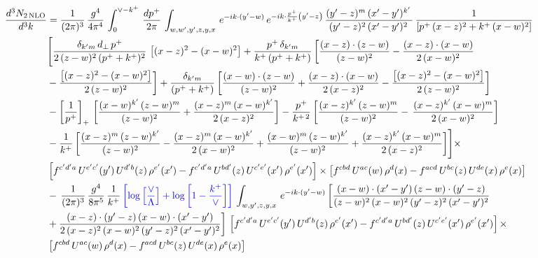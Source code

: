 \documentclass[9pt]{article}
\numberwithin{equation}{section}
\begin{document}
\begin{align}
 \frac{d^{3}N_{2\,\rm NLO}}{d^{3}k} & = \frac{1}{(2\pi)^{3}}\,\frac{g^{4}}{4\pi^{4}}\,\int_{0}^{\vee-k^{+}}\, \frac{dp^{+}}{2\pi}\,\int_{w,w',y',z,y,x}\, e^{-ik\cdot (y'-w)}\,e^{-ik\cdot \frac{p^{+}}{k^{+}}\left(y'-z\right)}\, \frac{(y'-z)^{m}\,(x'-y')^{k'}\,}{(y'-z)^{2}\,(x'-y')^{2}\,}\, \frac{1}{\left[p^{+}\,(x-z)^{2}+k^{+}\,(x-w)^{2}\right]}\notag \\ & \Bigg[\frac{\delta_{k'm}\,d_{\perp}\,p^{+}}{2\,(z-w)^{2}\,(p^{+}+k^{+})^{2}}\, \left[(x-z)^{2}-(x-w)^{2}\right]+\frac{p^{+}\,\delta_{k'm}}{k^{+}\,(p^{+}+k^{+})}\,\bigg[\frac{(x-z)\cdot (z-w)}{(z-w)^{2}} -\frac{(x-z)\cdot (x-w)}{2\,(x-w)^{2}}\notag \\ & -\frac{\left[(x-z)^{2}-(x-w)^{2}\right]}{2\,(z-w)^{2}}\bigg] +\frac{\delta_{k'm}}{(p^{+}+k^{+})}\,\bigg[\frac{(x-w)\cdot (z-w)}{(z-w)^{2}}+\frac{(x-z)\cdot (x-w)}{2\,(x-z)^{2}} -\frac{\left[(x-z)^{2}-(x-w)^{2}\right]}{2\,(z-w)^{2}}\bigg]\notag \\ & -\left[\frac{1}{p^{+}}\right]_{+}\,\bigg[\frac{(x-w)^{k'}\,(z-w)^{m}}{(z-w)^{2}}+\frac{(x-z)^{m}\,(x-w)^{k'}}{2\,(x-z)^{2}}\bigg]-\frac{p^{+}}{k^{+\,2}}\,\bigg[\frac{(x-z)^{k'}\,(z-w)^{m}}{(z-w)^{2}} -\,\frac{(x-z)^{k'}\,(x-w)^{m}}{2\,(x-w)^{2}}\bigg]\notag \\ & -\frac{1}{k^{+}}\,\bigg[\frac{(x-z)^{m}\,(z-w)^{k'}}{(z-w)^{2}}-\frac{(x-z)^{m}\,(x-w)^{k'}}{2\,(x-w)^{2}}+\frac{(x-w)^{m}\,(z-w)^{k'}}{(z-w)^{2}} +\frac{(x-z)^{k'}\,(x-w)^{m}}{2\,(x-z)^{2}}\bigg]\Bigg]\times\,\notag \\ & \left[f^{c'd'a}\,U^{e'c'}(y')\,U^{d'b}(z)\,\rho^{e'}(x')-f^{c'd'a}\, 
    U^{bd'}(z)\,U^{c'e'}(x')\,\rho^{e'}(x')\right]\times \left[f^{cbd}\,U^{ac}(w)\,\rho^{d}(x) -f^{acd}\,U^{bc}(z)\,U^{de}(x)\,\rho^{e}(x)\right]\notag \\ &  -\, \frac{1}{(2\pi)^{3}}\,\frac{g^{4}}{8\pi^{5}}\,\frac{1}{k^{+}}\,{\color{blue}\left[\log{\left[\frac{\vee}{\Lambda}\right]}+\log{\left[1-\frac{k^{+}}{\vee}\right]}\right]}\,\int_{w,y',z,y,x}\, e^{-ik\cdot (y'-w)}\,\bigg[\frac{(x-w)\cdot (x'-y')\,(z-w)\cdot (y'-z)}{(z-w)^{2}\,(x-w)^{2}\,(y'-z)^{2}\,(x'-y')^{2}}\notag \\ & +\frac{(x-z)\cdot (y'-z)\,(x-w)\cdot (x'-y')}{2\,(x-z)^{2}\,(x-w)^{2}\,(y'-z)^{2}\,(x'-y')^{2}}\bigg]\, \left[f^{c'd'a}\,U^{e'c'}(y')\,U^{d'b}(z)\,\rho^{e'}(x')-f^{c'd'a}\, 
    U^{bd'}(z)\,U^{c'e'}(x')\,\rho^{e'}(x')\right]\times\notag \\ &  \left[f^{cbd}\,U^{ac}(w)\,\rho^{d}(x) -f^{acd}\,U^{bc}(z)\,U^{de}(x)\,\rho^{e}(x)\right] 
\end{align}
\end{document}
